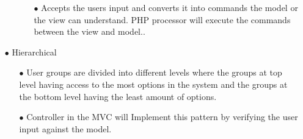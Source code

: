 \documentclass[a4paper,12pt]{article}
\begin{document}
\begin{itemize}
\begin{itemize}
				\begin{itemize}
				\item[$\bullet$]Accepts the users input and converts it into commands the model or the view can understand. PHP processor will execute the commands between the view and model..
				\end{itemize}
			\end{itemize}
		\item[$\bullet$]Hierarchical
			\begin{itemize}
			\item[$\bullet$]User groups are divided into different levels where the groups at top level having access to the most options in the system and the groups at the bottom level having the least amount of options. 
			\item[$\bullet$] Controller in the MVC will Implement this pattern by verifying the user input against the model.
			\end{itemize}
\end{itemize}

\newpage
\end{document}
